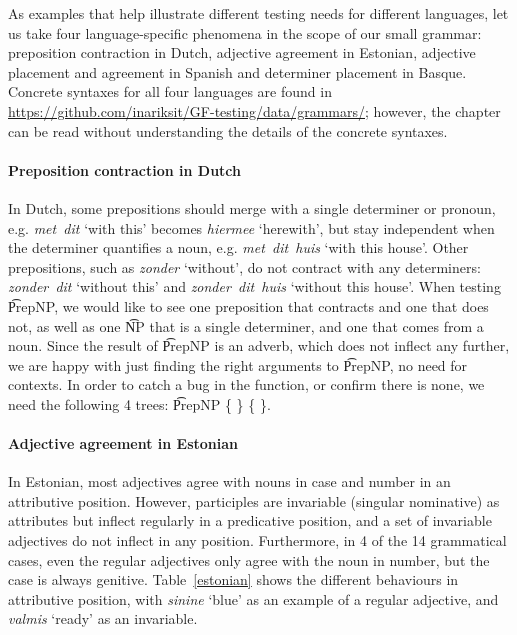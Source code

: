 As examples that help illustrate different testing needs for different
languages, let us take four language-specific phenomena in the scope
of our small grammar: preposition contraction in Dutch, adjective
agreement in Estonian, adjective placement and agreement in Spanish
and determiner placement in Basque. Concrete syntaxes for all four
languages are found in
\url{https://github.com/inariksit/GF-testing/data/grammars/}; however,
the chapter can be read without understanding the details of the
concrete syntaxes.

\paragraph{Preposition contraction in Dutch} In Dutch, some prepositions should
merge with a single determiner or pronoun, e.g. \emph{met~dit} `with
this' becomes \emph{hiermee} `herewith', but stay independent when the
determiner quantifies a noun, e.g. \emph{met~dit~huis} `with this house'. 
Other prepositions, such as \emph{zonder} `without', do not
contract with any determiners: \emph{zonder~dit} `without this' and
\emph{zonder~dit~huis} `without this house'.
When testing \t{PrepNP}, we would like to see one preposition that
contracts and one that does not, as well as one \t{NP} that is a
single determiner, and one that comes from a noun. Since the result of
\t{PrepNP} is an adverb, which does not inflect any further, we are
happy with just finding the right arguments to \t{PrepNP}, no need for contexts.
In order to catch a bug in the function, or confirm there is none, we
need the following 4 trees: 
\t{PrepNP} \{  \} 
           \{  \}. 


\paragraph{Adjective agreement in Estonian} In Estonian,
most adjectives agree with nouns in case and number in an attributive
position. However, participles are invariable (singular nominative) as 
attributes but inflect regularly in a predicative position, and a set
of invariable adjectives do not inflect in any position. Furthermore,
in 4 of the 14 grammatical cases, even the regular adjectives only
agree with the noun in number, but the case is always genitive.
Table~\ref{estonian} shows the different behaviours in attributive
position, with \emph{sinine} `blue' as an example of a regular
adjective, and \emph{valmis} `ready' as an invariable.

